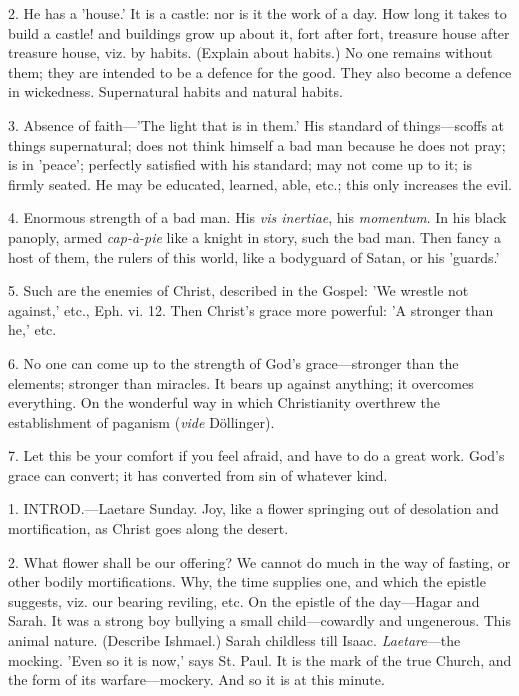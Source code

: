 2. He has a 'house.' It is a castle: nor is it
the work of a day. How long it takes to build a castle! and buildings
grow up about it, fort after fort, treasure house after treasure
house, viz. by habits. (Explain about habits.) No one remains without
them; they are intended to be a defence for the good. They also become
a defence in wickedness. Supernatural habits and natural habits.

3. Absence of faith—'The light that is in
them.' His standard of things—scoffs at things supernatural; does
not think himself a bad man because he does not pray; is in 'peace';
perfectly satisfied with his standard; may not come up to it; is
firmly seated. He may be educated, learned, able, etc.; this only
increases the evil.

4. Enormous strength of a bad man. His \emph{vis
inertiae}, his \emph{momentum}. In his black panoply, armed \emph{cap-à-pie}
like a knight in story, such the bad man. Then fancy a host of them,
the rulers of this world, like a bodyguard of Satan, or his 'guards.'

5. Such are the enemies of Christ, described in
the Gospel: 'We wrestle not against,' etc., Eph. vi. 12. Then Christ's
grace more powerful: 'A stronger than he,' etc.

6. No one can come up to the strength of God's
grace—stronger than the elements; stronger than miracles. It bears
up against anything; it overcomes everything. On the wonderful way in
which Christianity overthrew the establishment of paganism (\emph{vide}
Döllinger).

7. Let this be your comfort if you feel afraid,
and have to do a great work. God's grace can convert; it has converted
from sin of whatever kind.


1. INTROD.—Laetare
Sunday. Joy, like a flower springing out of desolation and
mortification, as Christ goes along the desert.

2. What flower shall be our offering? We cannot
do much in the way of fasting, or other bodily mortifications. Why,
the time supplies one, and which the epistle suggests, viz. our
bearing reviling, etc. On the epistle of the day—Hagar and
Sarah. It was a strong boy bullying a small child—cowardly and
ungenerous. This animal nature. (Describe Ishmael.) Sarah childless
till Isaac. \emph{Laetare}—the mocking. 'Even so it is now,' says
St. Paul. It is the mark of the true Church, and the form of its
warfare—mockery. And so it is at this minute.

